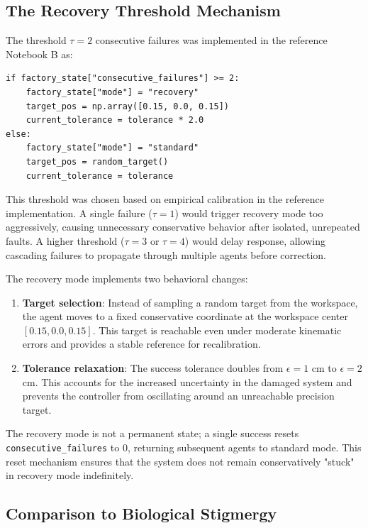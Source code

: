 \documentclass[12pt,a4paper,oneside]{report}
\begin{document}
\subsection{The Recovery Threshold Mechanism}

The threshold $\tau = 2$ consecutive failures was implemented in the reference Notebook B as:

\begin{verbatim}
if factory_state["consecutive_failures"] >= 2:
    factory_state["mode"] = "recovery"
    target_pos = np.array([0.15, 0.0, 0.15])
    current_tolerance = tolerance * 2.0
else:
    factory_state["mode"] = "standard"
    target_pos = random_target()
    current_tolerance = tolerance
\end{verbatim}

This threshold was chosen based on empirical calibration in the reference implementation. A single failure ($\tau = 1$) would trigger recovery mode too aggressively, causing unnecessary conservative behavior after isolated, unrepeated faults. A higher threshold ($\tau = 3$ or $\tau = 4$) would delay response, allowing cascading failures to propagate through multiple agents before correction.

The recovery mode implements two behavioral changes:

\begin{enumerate}
    \item \textbf{Target selection}: Instead of sampling a random target from the workspace, the agent moves to a fixed conservative coordinate at the workspace center $[0.15, 0.0, 0.15]$. This target is reachable even under moderate kinematic errors and provides a stable reference for recalibration.
    \item \textbf{Tolerance relaxation}: The success tolerance doubles from $\epsilon = 1$ cm to $\epsilon = 2$ cm. This accounts for the increased uncertainty in the damaged system and prevents the controller from oscillating around an unreachable precision target.
\end{enumerate}

The recovery mode is not a permanent state; a single success resets \texttt{consecutive\_failures} to 0, returning subsequent agents to standard mode. This reset mechanism ensures that the system does not remain conservatively "stuck" in recovery mode indefinitely.

\subsection{Comparison to Biological Stigmergy}
\end{document}
